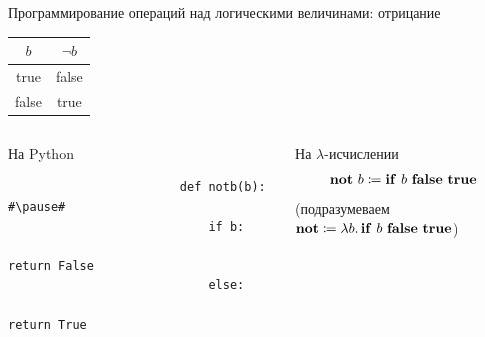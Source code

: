     \begin{frame}[fragile]{Программирование операций над логическими величинами: отрицание}
        \begin{center}
            \begin{tabular}{|c|c|}
                \hline
                $b$   & $\neg b$ \\ \hline
                true  & false    \\
                false & true     \\ \hline
            \end{tabular}
        \end{center}

        \begin{columns}[onlytextwidth]
            \begin{column}[t]{0.485\textwidth}
                \begin{block}{На Python}
                    \begin{verbatim}
                        def notb(b): #\pause#
                            if b:
                                return False
                            else:
                                return True
                    \end{verbatim}
                \end{block}
            \end{column}\hfill
            \pause%
            \begin{column}[t]{0.485\textwidth}
                \begin{block}{На $\lambda$-исчислении}
                    \pause
                    \[
                        \mathbf{not}~ b\coloneqq \mathbf{if} ~ b ~ \mathbf{false} ~ \mathbf{true}
                    \]
                    (подразумеваем $\mathbf{not} \coloneqq \lambda b\ldotp \mathbf{if} ~ b ~ \mathbf{false} ~ \mathbf{true}$)
                \end{block}
            \end{column}
        \end{columns}
    \end{frame}

